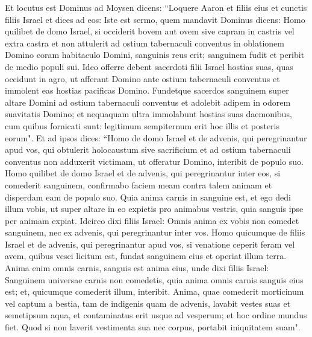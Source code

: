 \begin{biblechapter}  
\verse Et locutus est Dominus ad Moysen dicens: 
\verse “Loquere Aaron et filiis eius et cunctis filiis Israel et dices ad eos: Iste est sermo, quem mandavit Dominus dicens: 
\verse Homo quilibet de domo Israel, si occiderit bovem aut ovem sive capram in castris vel extra castra 
\verse et non attulerit ad ostium tabernaculi conventus in oblationem Domino coram habitaculo Domini, sanguinis reus erit; sanguinem fudit et peribit de medio populi sui. 
\verse Ideo offerre debent sacerdoti filii Israel hostias suas, quas occidunt in agro, ut afferant Domino ante ostium tabernaculi conventus et immolent eas hostias pacificas Domino. 
\verse Fundetque sacerdos sanguinem super altare Domini ad ostium tabernaculi conventus et adolebit adipem in odorem suavitatis Domino; 
\verse et nequaquam ultra immolabunt hostias suas daemonibus, cum quibus fornicati sunt: legitimum sempiternum erit hoc illis et posteris eorum". 
\verse Et ad ipsos dices: “Homo de domo Israel et de advenis, qui peregrinantur apud vos, qui obtulerit holocaustum sive sacrificium 
\verse et ad ostium tabernaculi conventus non adduxerit victimam, ut offeratur Domino, interibit de populo suo. 
\verse Homo quilibet de domo Israel et de advenis, qui peregrinantur inter eos, si comederit sanguinem, confirmabo faciem meam contra talem animam et disperdam eam de populo suo. 
\verse Quia anima carnis in sanguine est, et ego dedi illum vobis, ut super altare in eo expietis pro animabus vestris, quia sanguis ipse per animam expiat. 
\verse Idcirco dixi filiis Israel: Omnis anima ex vobis non comedet sanguinem, nec ex advenis, qui peregrinantur inter vos. 
\verse Homo quicumque de filiis Israel et de advenis, qui peregrinantur apud vos, si venatione ceperit feram vel avem, quibus vesci licitum est, fundat sanguinem eius et operiat illum terra. 
\verse Anima enim omnis carnis, sanguis est anima eius, unde dixi filiis Israel: Sanguinem universae carnis non comedetis, quia anima omnis carnis sanguis eius est; et, quicumque comederit illum, interibit. 
\verse Anima, quae comederit morticinum vel captum a bestia, tam de indigenis quam de advenis, lavabit vestes suas et semetipsum aqua, et contaminatus erit usque ad vesperum; et hoc ordine mundus fiet. 
\verse Quod si non laverit vestimenta sua nec corpus, portabit iniquitatem suam". 
\end{biblechapter}

